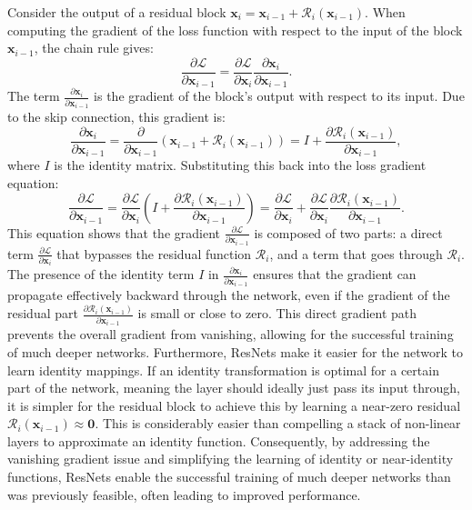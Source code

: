 Consider the output of a residual block \( \bm{x}_i = \bm{x}_{i-1} + \mathcal{R}_i(\bm{x}_{i-1}) \). When computing the gradient of the loss function with respect to the input of the block \( \bm{x}_{i-1} \), the chain rule gives:
\begin{equation*}
    \frac{\partial \mathcal{L}}{\partial \bm{x}_{i-1}} = \frac{\partial \mathcal{L}}{\partial \bm{x}_i} \frac{\partial \bm{x}_i}{\partial \bm{x}_{i-1}}.
\end{equation*}
The term \( \frac{\partial \bm{x}_i}{\partial \bm{x}_{i-1}} \) is the gradient of the block's output with respect to its input. Due to the skip connection, this gradient is:
\begin{equation*}
    \frac{\partial \bm{x}_i}{\partial \bm{x}_{i-1}} = \frac{\partial}{\partial \bm{x}_{i-1}} (\bm{x}_{i-1} + \mathcal{R}_i(\bm{x}_{i-1})) = I + \frac{\partial \mathcal{R}_i(\bm{x}_{i-1})}{\partial \bm{x}_{i-1}},
\end{equation*}
where \( I \) is the identity matrix. Substituting this back into the loss gradient equation:
\begin{equation*}
    \frac{\partial \mathcal{L}}{\partial \bm{x}_{i-1}} = \frac{\partial \mathcal{L}}{\partial \bm{x}_i} \left( I + \frac{\partial \mathcal{R}_i(\bm{x}_{i-1})}{\partial \bm{x}_{i-1}} \right) = \frac{\partial \mathcal{L}}{\partial \bm{x}_i} + \frac{\partial \mathcal{L}}{\partial \bm{x}_i} \frac{\partial \mathcal{R}_i(\bm{x}_{i-1})}{\partial \bm{x}_{i-1}}.
\end{equation*}
This equation shows that the gradient \( \frac{\partial \mathcal{L}}{\partial \bm{x}_{i-1}} \) is composed of two parts: a direct term \( \frac{\partial \mathcal{L}}{\partial \bm{x}_i} \) that bypasses the residual function \( \mathcal{R}_i \), and a term that goes through \( \mathcal{R}_i \). The presence of the identity term \( I \) in \( \frac{\partial \bm{x}_i}{\partial \bm{x}_{i-1}} \) ensures that the gradient can propagate effectively backward through the network, even if the gradient of the residual part \( \frac{\partial \mathcal{R}_i(\bm{x}_{i-1})}{\partial \bm{x}_{i-1}} \) is small or close to zero. This direct gradient path prevents the overall gradient from vanishing, allowing for the successful training of much deeper networks.
Furthermore, ResNets make it easier for the network to learn identity mappings. If an identity transformation is optimal for a certain part of the network, meaning the layer should ideally just pass its input through, it is simpler for the residual block to achieve this by learning a near-zero residual \( \mathcal{R}_i(\bm{x}_{i-1}) \approx \bm{0} \). This is considerably easier than compelling a stack of non-linear layers to approximate an identity function. Consequently, by addressing the vanishing gradient issue and simplifying the learning of identity or near-identity functions, ResNets enable the successful training of much deeper networks than was previously feasible, often leading to improved performance.

